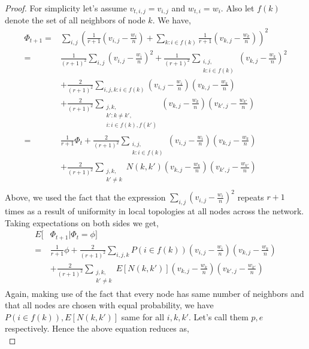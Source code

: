 \documentclass{article}
\begin{document}
\begin{proof}
For simplicity let's assume $v_{t,i,j}=v_{i,j}$ and $w_{t,i}=w_i$. Also let $f(k)$ denote the set of all neighbors of node $k$. We have, \\
\begingroup
\fontsize{8pt}{10pt}\selectfont
\begin{align*}
\Phi_{t+1} =& \sum\limits_{i,j} \left( \frac{1}{r+1}(v_{i,j}-\frac{w_i}{n}) + \sum\limits_{k:i \in f(k)} \frac{1}{r+1} (v_{k,j}-\frac{w_k}{n}) \right)^2 \\
=& \frac{1}{(r+1)^2} \sum\limits_{i,j} (v_{i,j}-\frac{w_i}{n})^2 + \frac{1}{(r+1)^2} \sum\limits_{\substack{i,j,\\ k:i \in f(k)}} (v_{k,j}-\frac{w_k}{n})^2 \\
&+\frac{2}{(r+1)^2} \sum\limits_{i,j,k:i \in f(k)} (v_{i,j}-\frac{w_i}{n})(v_{k,j}-\frac{w_k}{n}) \\
&+\frac{2}{(r+1)^2} \sum\limits_{\substack{j,k, \\ k':k \neq k', \\ i:i \in f(k),f(k')}} (v_{k,j}-\frac{w_k}{n})(v_{k',j}-\frac{w_{k'}}{n}) \\
=& \frac{1}{r+1}\Phi_t + \frac{2}{(r+1)^2}\sum\limits_{\substack{i,j,\\ k:i \in f(k)}} (v_{i,j}-\frac{w_i}{n})(v_{k,j}-\frac{w_k}{n}) \\
&+\frac{2}{(r+1)^2} \sum\limits_{\substack{j,k,\\ k' \neq k}}N(k,k')(v_{k,j}-\frac{w_k}{n})(v_{k',j}-\frac{w_{k'}}{n}) \\
\end{align*}
\endgroup
Above, we used the fact that the expression $\sum\limits_{i,j}(v_{i,j}-\frac{w_i}{n})^2$ repeats $r+1$ times as a result of uniformity in local topologies at all nodes across the network. Taking expectations on both sides we get, \\
\begingroup
\fontsize{8pt}{10pt}\selectfont
\begin{align*}
E[& \Phi_{t+1}|\Phi_t=\phi] \\ 
=& \frac{1}{r+1}\phi + \frac{2}{(r+1)^2} \sum\limits_{i,j,k}P(i \in f(k))(v_{i,j}-\frac{w_i}{n})(v_{k,j}-\frac{w_k}{n}) \\
&+ \frac{2}{(r+1)^2} \sum\limits_{\substack{j,k, \\ k' \neq k}} E[N(k,k')] (v_{k,j}-\frac{w_k}{n})(v_{k',j}-\frac{w_{k'}}{n}) 
\end{align*}
\endgroup
Again, making use of the fact that every node has same number of neighbors and that all nodes are chosen with equal probability, we have $P(i \in f(k)),E[N(k,k')]$ same for all $i,k,k'$. Let's call them $p,e$ respectively. Hence the above equation reduces as, \\

\end{proof}
\end{document}
